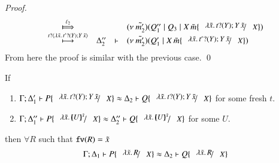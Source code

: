 \begin{proof}
\[\begin{array}{crll}
			\Hby{\ell_2}& & &
			\newsp{\tilde{m_2'}}{Q_1'' \Par Q_3 \Par \appl{X}{\tilde{m}} \subst{\abs{\tilde{x}}{\binp{t}{Y} \appl{Y}{\tilde{x}}}}{X}} \\
			\hby{\bactinp{t}{\abs{\tilde{x}}{\binp{t'}{Y} \appl{Y}{\tilde{x}}}}}
			&\Delta_2''& \proves& \newsp{\tilde{m_2'}}{Q_1' \Par \appl{X}{\tilde{m}} \subst{\abs{\tilde{x}}{\binp{t'}{Y} \appl{Y}{\tilde{x}}}}{X}} \\
		\end{array}
	\]
%
%
	\noi From here the proof is similar with the previous case.
	\qed
\end{proof}



\begin{lemma}\rm
	If 
%
	\begin{enumerate}
		\item	$\horel{\Gamma}{\Delta_1'}{P \subst{\abs{\tilde{x}}{\binp{t}{Y} \appl{Y}{\tilde{x}}}}{X}}{\wb}{\Delta_2}{Q \subst{\abs{\tilde{x}}{\binp{t}{Y} \appl{Y}{\tilde{x}}}}{X}}$
			for some fresh $t$.

		\item	$\horel{\Gamma}{\Delta_1''}{P \subst{\abs{\tilde{x}}{\mapchar{U}{\tilde{x}}}}{X}}{\wb}{\Delta_2''}{Q \subst{\abs{\tilde{x}}{\mapchar{U}{\tilde{x}}}}{X}}$
			for some $U$.
	\end{enumerate}
%
	then $\forall R$ such that $\mathtt{fv}(R) = \tilde{x}$
\[
	\horel{\Gamma}{\Delta_1}{P \subst{\abs{\tilde{x}}{R}}{X}}{\wb}{\Delta_2}{Q \subst{\abs{\tilde{x}}{R}}{X}}
\]
\end{lemma}


